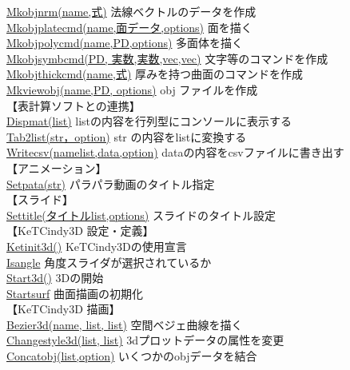 \documentclass[papersize,a4paper,12pt,uplatex]{jsarticle}
\begin{document}
\begin{tabbing}
\hyperlink{mkobjnrm}{Mkobjnrm(name,式)} \>法線ベクトルのデータを作成\\
\hyperlink{mkobjplatecmd}{Mkobjplatecmd(name,面データ,options)} \>面を描く\\
\hyperlink{mkobjpolycmd}{Mkobjpolycmd(name,PD,options)} \>多面体を描く\\
\hyperlink{mkobjsymbcmd}{Mkobjsymbcmd(PD, 実数,実数,vec,vec)} \>文字等のコマンドを作成\\
\hyperlink{mkobjthickcmd}{Mkobjthickcmd(name,式)} \>厚みを持つ曲面のコマンドを作成\\
\hyperlink{mkviewobj}{Mkviewobj(name,PD, options)} \>obj ファイルを作成\\
\vspace{\baselineskip}
【表計算ソフトとの連携】\\
\hyperlink{dispmat}{Dispmat(list)}  \>listの内容を行列型にコンソールに表示する\\
\hyperlink{tab2list}{Tab2list(str，option)}  \>str の内容をlistに変換する\\
\hyperlink{writecsv}{Writecsv(namelist,data,option)}  \>dataの内容をcsvファイルに書き出す\\
\vspace{\baselineskip}
【アニメーション】\\
\hyperlink{setpara}{Setpata(str)}  \>パラパラ動画のタイトル指定\\
【スライド】\\
\hyperlink{settitle}{Settitle(タイトルlist,options)}  \>スライドのタイトル設定\\
【KeTCindy3D  設定・定義】\\
\hyperlink{ketinit3d}{Ketinit3d()}  \>KeTCindy3Dの使用宣言\\
\hyperlink{isangle}{Isangle}  \>角度スライダが選択されているか\\
\hyperlink{start3d}{Start3d()}  \>3Dの開始\\
\hyperlink{startsurf}{Startsurf}  \>曲面描画の初期化\\
\vspace{\baselineskip}
【KeTCindy3D  描画】\\
\hyperlink{bezier3d}{Bezier3d(name, list, list)}  \>空間ベジェ曲線を描く\\
\hyperlink{changestyle3d}{Changestyle3d(list, list)}  \>3dプロットデータの属性を変更\\
\hyperlink{concatobj}{Concatobj(list,option)}  \>いくつかのobjデータを結合\\

\end{tabbing}
\end{document}
